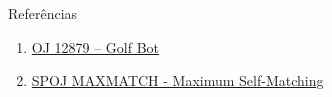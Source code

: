 \begin{frame}[fragile]{Referências}

    \begin{enumerate}
        \item \href{https://onlinejudge.org/index.php?option=com_onlinejudge&Itemid=8&category=24&page=show_problem&problem=4744}{OJ 12879 -- Golf Bot}
 
        \item \href{https://www.spoj.com/problems/MAXMATCH/}{SPOJ MAXMATCH - Maximum Self-Matching} 



    \end{enumerate}

\end{frame}
